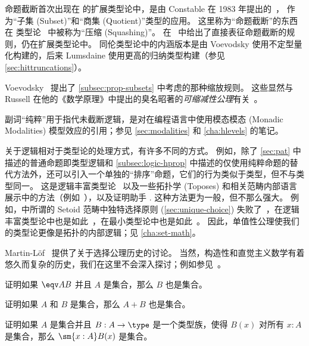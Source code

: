命题截断首次出现在
%
\NuPRL 的扩展类型论中，是由 Constable 在 1983 年提出的~\cite{Con85}，
作为“子集 (Subset)”和“商集 (Quotient)”类型的应用。
这里称为“命题截断”的东西在 \NuPRL 类型论~\cite{constable+86nuprl-book} 中被称为“压缩 (Squashing)”。
在~\cite{ab:bracket-types} 中给出了直接表征命题截断的规则，仍在扩展类型论中。
同伦类型论中的内涵版本是由 Voevodsky 使用不定型量化构建的，后来 Lumsdaine 使用更高的归纳类型构建（参见 \cref{sec:hittruncations}）。

%
Voevodsky~\cite{Universe-poly} 提出了 \cref{subsec:prop-subsets} 中考虑的那种缩放规则。
%
这些显然与 Russell 在他的《数学原理》中提出的臭名昭著的\emph{可缩减性公理}有关~\cite{PM2}。

副词“纯粹”用于指代未截断逻辑，是对在编程语言中使用模态模态 (Monadic Modalities) 模型效应的引用；参见 \cref{sec:modalities} 和 \cref{cha:hlevels} 的笔记。

关于逻辑相对于类型论的处理方式，有许多不同的方式。
例如，除了 \cref{sec:pat} 中描述的普通命题即类型逻辑和 \cref{subsec:logic-hprop} 中描述的仅使用纯粹命题的替代方法外，还可以引入一个单独的“排序”命题，它们的行为类似于类型，但不与类型同一。
这是逻辑丰富类型论~\cite{aczel2002collection} 以及一些拓扑学 (Toposes) 和相关范畴内部语言展示中的方法（例如~\cite{jacobs1999categorical,elephant}），以及证明助手 \Coq.
这种方法更为一般，但不那么强大。
例如，\Coq 中所谓的 Setoid 范畴中独特选择原则 (\cref{sec:unique-choice}) 失败了~\cite{Spiwack}，在逻辑丰富类型论中也是如此~\cite{aczel2002collection}，在最小类型论中也是如此~\cite{maietti2005toward}。
因此，单值性公理使我们的类型论更像是拓扑的内部逻辑；见 \cref{cha:set-math}。

Martin-L\"of~\cite{martin2006100} 提供了关于选择公理历史的讨论。
当然，构造性和直觉主义数学有着悠久而复杂的历史，我们在这里不会深入探讨；例如参见~\cite{TroelstraI,TroelstraII}。

\sectionExercises

\begin{ex}\label{ex:equiv-functor-set}
证明如果 $\eqv A B$ 并且 $A$ 是集合，那么 $B$ 也是集合。
\end{ex}

\begin{ex}\label{ex:isset-coprod}
证明如果 $A$ 和 $B$ 是集合，那么 $A+B$ 也是集合。
\end{ex}

\begin{ex}\label{ex:isset-sigma}
证明如果 $A$ 是集合并且 $B:A\to \type$ 是一个类型族，使得 $B(x)$ 对所有 $x:A$ 是集合，那么 $\sm{x:A} B(x)$ 是集合。
\end{ex}

